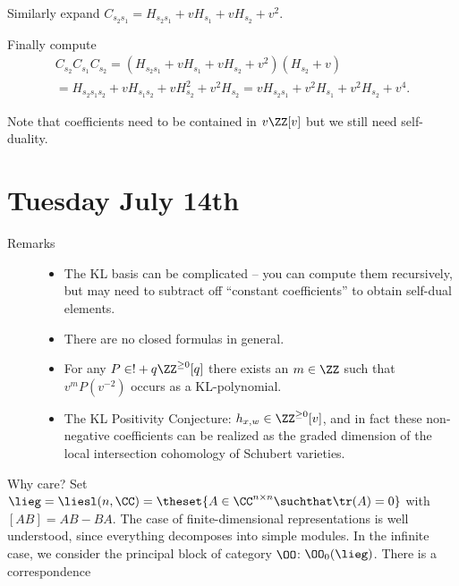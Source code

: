 Similarly expand
\(C_{s_2 s_1} = H_{s_2 s_1} + vH_{s_1} + vH_{s_2} + v^2\).

Finally compute \begin{align*}
C_{s_2} C_{s_1} C_{s_2} 
= (H_{s_2s_1} +v H_{s_1} + vH_{s_2} + v^2 )(H_{s_2} + v) \\
= H_{s_2 s_1 s_2} + v H_{s_1 s_2} + v H_{s_2}^2 + v^2 H_s_2 = v H_{s_2 s_1} + v^2 H_{s_1} + v^2 H_{s_2} + v^4
.\end{align*}

Note that coefficients need to be contained in \(v\ZZ[v]\) but we still
need self-duality.

\hypertarget{tuesday-july-14th}{%
\section{Tuesday July 14th}\label{tuesday-july-14th}}

\begin{description}
\item[Remarks]
\hfill

\begin{itemize}
\tightlist
\item
  The KL basis can be complicated -- you can compute them recursively,
  but may need to subtract off ``constant coefficients'' to obtain
  self-dual elements.
\item
  There are no closed formulas in general.
\item
  For any \(P\in ! + q \ZZ^{\geq 0}[q]\) there exists an \(m\in \ZZ\)
  such that \(v^m P(v^{-2})\) occurs as a KL-polynomial.
\item
  The KL Positivity Conjecture: \(h_{x, w} \in \ZZ^{\geq 0} [v]\), and
  in fact these non-negative coefficients can be realized as the graded
  dimension of the local intersection cohomology of Schubert varieties.
\end{itemize}
\end{description}

Why care? Set
\(\lieg = \liesl(n, \CC) = \theset{A\in \CC^{n\times n} \suchthat \tr(A) = 0}\)
with \([AB] = AB - BA\). The case of finite-dimensional representations
is well understood, since everything decomposes into simple modules. In
the infinite case, we consider the principal block of category \(\OO\):
\(\OO_0(\lieg)\). There is a correspondence

\begin{center}
\end{center}

